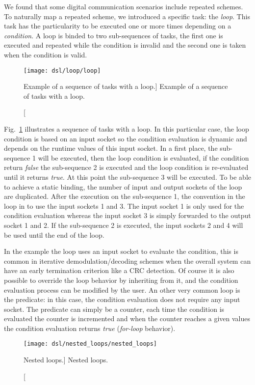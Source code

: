 We found that some digital communication scenarios include repeated schemes.
To naturally map a repeated scheme, we introduced a specific task: the
\emph{loop}. This task has the particularity to be executed one or more times
depending on a \emph{condition}. A loop is binded to two sub-sequences of tasks,
the first one is executed and repeated while the condition is invalid and the
second one is taken when the condition is valid.

\begin{figure}[htp]
  \centering
  \texttt{[image: dsl/loop/loop]}
  \caption
    [Example of a sequence of tasks with a loop.]
    {Example of a sequence of tasks with a loop.}
  \label{fig:dsl_loop}
\end{figure}

Fig.~\ref{fig:dsl_loop} illustrates a sequence of tasks with a loop. In this
particular case, the loop condition is based on an input socket so the condition
evaluation is dynamic and depends on the runtime values of this input socket.
In a first place, the sub-sequence 1 will be executed, then the loop condition
is evaluated, if the condition return \emph{false} the sub-sequence 2 is
executed and the loop condition is re-evaluated until it returns \emph{true}. At
this point the sub-sequence 3 will be executed. To be able to achieve a static
binding, the number of input and output sockets of the loop are duplicated.
After the execution on the sub-sequence 1, the convention in the loop in to use
the input sockets 1 and 3. The input socket 1 is only used for the condition
evaluation whereas the input socket 3 is simply forwarded to the output socket 1
and 2. If the sub-sequence 2 is executed, the input sockets 2 and 4 will be used
until the end of the loop.

In the example the loop uses an input socket to evaluate the condition, this is
common in iterative demodulation/decoding schemes when the overall system can
have an early termination criterion like a CRC detection. Of course it is also
possible to override the loop behavior by inheriting from it, and the condition
evaluation process can be modified by the user. An other very common loop is the
predicate: in this case, the condition evaluation does not require any input
socket. The predicate can simply be a counter, each time the condition is
evaluated the counter is incremented and when the counter reaches a given values
the condition evaluation returns \emph{true} (\emph{for-loop} behavior).

\begin{figure}[htp]
  \centering
  \texttt{[image: dsl/nested\_loops/nested\_loops]}
  \caption
    [Nested loops.]
    {Nested loops.}
  \label{fig:dsl_nested_loops}
\end{figure}

